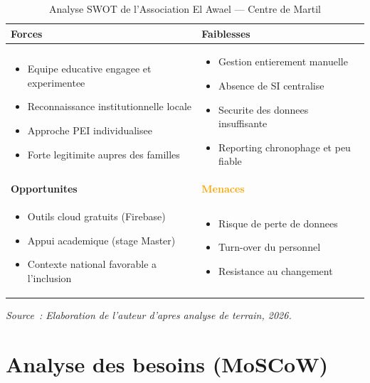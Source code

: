 \documentclass[12pt,a4paper,openany]{report}
\begin{document}
\begin{table}[H]
\centering
\caption{Analyse SWOT de l'Association El Awael --- Centre de Martil}
\label{tab:swot}
\begin{tabularx}{\textwidth}{XX}
\toprule
\textcolor{vertOK}{\bfseries Forces} & \textcolor{rougeKO}{\bfseries Faiblesses}\\
\midrule
\begin{itemize}[leftmargin=*,topsep=0pt]
  \item Equipe educative engagee et experimentee
  \item Reconnaissance institutionnelle locale
  \item Approche PEI individualisee
  \item Forte legitimite aupres des familles
\end{itemize}
&
\begin{itemize}[leftmargin=*,topsep=0pt]
  \item Gestion entierement manuelle
  \item Absence de SI centralise
  \item Securite des donnees insuffisante
  \item Reporting chronophage et peu fiable
\end{itemize}\\
\midrule
\textcolor{bleu}{\bfseries Opportunites} & \textcolor{orange}{\bfseries Menaces}\\
\midrule
\begin{itemize}[leftmargin=*,topsep=0pt]
  \item Outils cloud gratuits (Firebase)
  \item Appui academique (stage Master)
  \item Contexte national favorable a l'inclusion
\end{itemize}
&
\begin{itemize}[leftmargin=*,topsep=0pt]
  \item Risque de perte de donnees
  \item Turn-over du personnel
  \item Resistance au changement
\end{itemize}\\
\bottomrule
\end{tabularx}
\vspace{0.1cm}
\small\textit{Source~: Elaboration de l'auteur d'apres analyse de terrain, 2026.}
\end{table}

\section{Analyse des besoins (MoSCoW)}
\end{document}
